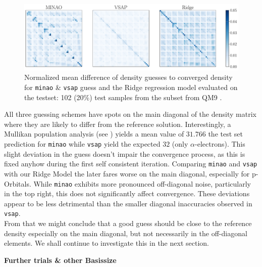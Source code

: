 \begin{figure}[H]
    \centering
    \includegraphics[width=\textwidth]{../fig/c5h4n2o2/density_error_comparison.pdf}
    \caption[Normalized difference of density guesses]{Normalized mean difference of density guesses to converged density for \texttt{minao} \& \texttt{vsap} guess and the Ridge regression model evaluated on the testset: 102 (20\%) test samples from the  subset from QM9 \parencite{ref:article1_qm9}.}
    \label{fig:density_error_comparison}
\end{figure}
All three guessing schemes have spots on the main diagonal of the density matrix where they are likely to differ from the reference solution. Interestingly, a Mullikan population analysis (see ) \parencite{ref:Mulliken_population_analysis} yields a mean value of $31.766$ the test set prediction for \texttt{minao} while \texttt{vsap} yield the expected $32$ (only $\alpha$-electrons). This slight deviation in the guess doesn't impair the convergence process, as this is fixed anyhow during the first self consistent iteration. Comparing \texttt{minao} and \texttt{vsap} with our Ridge Model the later fares worse on the main diagonal, especially for p-Orbitals. While \texttt{minao} exhibits more pronounced off-diagonal noise, particularly in the top right, this does not significantly affect convergence. These deviations appear to be less detrimental than the smaller diagonal inaccuracies observed in \texttt{vsap}. \\
From that we might conclude that a good guess should be close to the reference density especially on the main diagonal, but not necessarily in the off-diagonal elements. We shall continue to investigate this in the next section.

\textbf{Further trials \& other Basissize}\\


